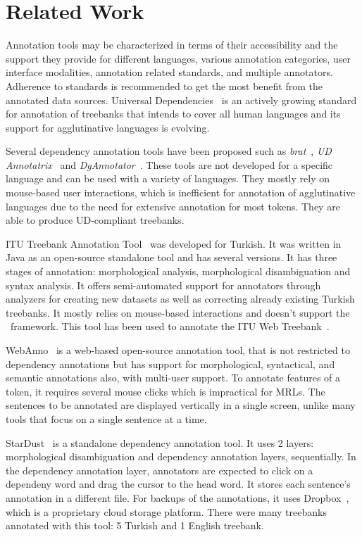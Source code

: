 \section{Related Work}
\label{sec:related}

Annotation tools may be characterized in terms of their accessibility and the support they provide for different languages, various annotation categories, user interface modalities, annotation related standards, and multiple annotators.
Adherence to standards is recommended to get the most benefit from the annotated data sources.
Universal Dependencies~\cite{UD} is an actively growing standard for annotation of treebanks that intends to cover all human languages and its support for agglutinative languages is evolving.

Several dependency annotation tools have been proposed such as \textit{brat}~\cite{brat}, \textit{UD Annotatrix}~\cite{ud-annotatrix} and \textit{DgAnnotator}~\cite{dgannotator,ud-tools}.
These tools are not developed for a specific language and can be used with a variety of languages.
They mostly rely on mouse-based user interactions, which is inefficient for annotation of agglutinative languages due to the need for extensive annotation for most tokens.
They are able to produce UD-compliant treebanks.

ITU Treebank Annotation Tool~\cite{itu-annotation-tool} was developed for Turkish.
It was written in Java as an open-source standalone tool and has several versions.
It has three stages of annotation: morphological analysis, morphological disambiguation and syntax analysis.
It offers semi-automated support for annotators through analyzers for creating new datasets as well as correcting already existing Turkish treebanks.
It mostly relies on mouse-based interactions and doesn't support the \ud\ framework.
This tool has been used to annotate the ITU Web Treebank~\cite{itu-web-tb}.

WebAnno~\cite{webanno} is a web-based open-source annotation tool, that is not restricted to dependency annotations but has support for morphological, syntactical, and semantic annotations also, with multi-user support.
To annotate features of a token, it requires several mouse clicks which is impractical for MRLs.
The sentences to be annotated are displayed vertically in a single screen, unlike many tools that focus on a single sentence at a time.

StarDust~\cite{stardust} is a standalone dependency annotation tool. It uses 2 layers: morphological disambiguation and dependency annotation layers, sequentially. In the dependency annotation layer, annotators are expected to click on a dependeny word and drag the cursor to the head word. It stores each sentence's annotation in a different file. For backups of the annotations, it uses Dropbox~\cite{dropbox}, which is a proprietary cloud storage platform. There were many treebanks annotated with this tool: 5 Turkish and 1 English treebank.

